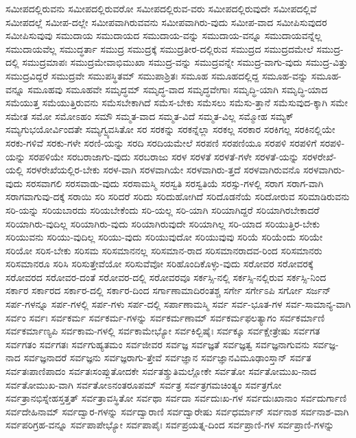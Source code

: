 {ಸಮೀಪದಲ್ಲಿರುವನು
ಸಮೀಪದಲ್ಲಿರುವರೋ
ಸಮೀಪದಲ್ಲಿರುವ-ವರು
ಸಮೀಪದಲ್ಲಿರುವುದೇ
ಸಮೀಪದಲ್ಲಿವೆ
ಸಮೀಪದಲ್ಲೆ
ಸಮೀಪ-ದಲ್ಲೇ
ಸಮೀಪವಾಗಿರುವವನು
ಸಮೀಪವಾಗಿರು-ವುದು
ಸಮೀಪ-ವಾದ
ಸಮೀಪಿಸುವುದರ
ಸಮೀಪಿಸುವುವು
ಸಮುದಾಯ
ಸಮುದಾಯದ
ಸಮುದಾಯ-ವನ್ನು
ಸಮುದಾಯ-ವನ್ನೂ
ಸಮುದಾಯವನ್ನೆಲ್ಲ
ಸಮುದಾಯವೆಲ್ಲ
ಸಮುದ್ಧರ್ತಾ
ಸಮುದ್ರ
ಸಮುದ್ರಕ್ಕೆ
ಸಮುದ್ರತೀರ-ದಲ್ಲಿರುವ
ಸಮುದ್ರದ
ಸಮುದ್ರದಮೇಲೆ
ಸಮುದ್ರ-ದಲ್ಲಿ
ಸಮುದ್ರಮಾಪಃ
ಸಮುದ್ರಮೇವಾಭಿಮುಖಾ
ಸಮುದ್ರ-ವನ್ನು
ಸಮುದ್ರವನ್ನೇ
ಸಮುದ್ರ-ವಾಗು-ವುದು
ಸಮುದ್ರ-ವಿತ್ತು
ಸಮುದ್ರವಿದ್ದರೆ
ಸಮುದ್ರವೇ
ಸಮುಪಸ್ಥಿತಮ್
ಸಮುಪಾಶ್ರಿತಃ
ಸಮೂಹ
ಸಮೂಹದಲ್ಲಿದ್ದ
ಸಮೂಹ-ವನ್ನು
ಸಮೂಹ-ವನ್ನೂ
ಸಮೂಹವು
ಸಮೂಹವೇ
ಸಮೃದ್ಧಮ್
ಸಮೃದ್ಧ-ವಾದ
ಸಮೃದ್ಧವೇಗಾಃ
ಸಮೃದ್ಧಿ-ಯಾಗಿ
ಸಮೃದ್ಧಿ-ಯಾದ
ಸಮೆಯುತ್ತ
ಸಮೆಯುತ್ತಿರುವನು
ಸಮೆಸಬೇಕಾಗಿದೆ
ಸಮೆಸ-ಬೇಕು
ಸಮೆಸಲು
ಸಮೆಸು-ತ್ತಾನೆ
ಸಮೆಸುವುದ-ಕ್ಕಾಗಿ
ಸಮೇ
ಸಮೇತ
ಸಮೋ
ಸಮೋಽಹಂ
ಸಮೌ
ಸಮ್ಮತ-ವಾದ
ಸಮ್ಮತ-ವಿದೆ
ಸಮ್ಮತ-ವಿಲ್ಲ
ಸಮ್ಮೋಹ
ಸಮ್ಯಕ್
ಸಮ್ಯಗುಭಯೋರ್ವಿಂದತೇ
ಸಮ್ಯಗ್ವ್ಯವಸಿತೋ
ಸರ
ಸರಕನ್ನು
ಸರಕನ್ನೆಲ್ಲಾ
ಸರಕಲ್ಲ
ಸರಕಾರ
ಸರಕಿಗಲ್ಲ
ಸರಕಿನಲ್ಲಿಯೇ
ಸರಕು-ಗಳಿವೆ
ಸರಕು-ಗಳೇ
ಸರಣಿ-ಯನ್ನು
ಸರದಿ
ಸರದಿಯಮೇಲೆ
ಸರಪಣಿ
ಸರಪಣಿಯೂ
ಸರಪಳಿ
ಸರಪಳಿಗೆ
ಸರಪಳಿ-ಯನ್ನು
ಸರಪಳಿಯೇ
ಸರಬರಾಜಾಗು-ವುದು
ಸರಬರಾಜು
ಸರಳ
ಸರಳತೆ
ಸರಳತೆ-ಗಳೇ
ಸರಳತೆ-ಯನ್ನು
ಸರಳರೇಖೆ-ಯಲ್ಲಿ
ಸರಳರೇಖೆಯಲ್ಲಿರ-ಬೇಕು
ಸರಳ-ವಾಗಿ
ಸರಳವಾಗಿಯೇ
ಸರಳವಾಗಿರು-ತ್ತದೆ
ಸರಳವಾಗಿರುವನೊ
ಸರಳವಾಗಿರು-ವುದು
ಸರಸವಾಗಲಿ
ಸರಸವಾಡು-ವುದು
ಸರಸಾಮಸ್ಮಿ
ಸರಸ್ವತಿ
ಸರಸ್ವತಿಯೆ
ಸರಸ್ಸು-ಗಳಲ್ಲಿ
ಸರಾಗ
ಸರಾಗ-ವಾಗಿ
ಸರಾಗವಾಗುವು-ದಕ್ಕೆ
ಸರಾಯಿ
ಸರಿ
ಸರಿದರೆ
ಸರಿದು
ಸರಿದುಹೋಗಿದೆ
ಸರಿದೊಡನೆಯೆ
ಸರಿದೋರುವ
ಸರಿಮಾಡಿರುವನು
ಸರಿ-ಯನ್ನು
ಸರಿಯಬಾರದು
ಸರಿಯಬೇಕೆಂದು
ಸರಿ-ಯಲ್ಲ
ಸರಿ-ಯಾಗಿ
ಸರಿಯಾಗಿದ್ದರೆ
ಸರಿಯಾಗಿರಬೇಕಾದರೆ
ಸರಿಯಾಗಿರು-ವುದಿಲ್ಲ
ಸರಿಯಾಗಿರು-ವುದು
ಸರಿಯಾಗಿರುವುದೇ
ಸರಿಯಾಗಿಲ್ಲ
ಸರಿ-ಯಾದ
ಸರಿಯುತ್ತಿರ-ಬೇಕು
ಸರಿಯುವನು
ಸರಿಯು-ವುದಿಲ್ಲ
ಸರಿಯು-ವುದು
ಸರಿಯುವುದೋ
ಸರಿಯುವುವು
ಸರಿಯೆ
ಸರಿಯೆಂದು
ಸರಿಯೇ
ಸರಿಯೋ
ಸರಿಸ-ಬೇಕು
ಸರಿಸಮ
ಸರಿಸಮಾನನಲ್ಲ
ಸರಿಸಮಾನ-ರಾದ
ಸರಿಸಮಾನರಾದವ-ರಿಂದ
ಸರಿಸಮಾನರು
ಸರಿಸಮಾನರೂ
ಸರಿಸಿ
ಸರಿಸುತ್ತೇವೆಯೋ
ಸರಿಸುವೆವೋ
ಸರಿಹೊಂದಿಕೊಳ್ಳು-ವುದು
ಸರೋವರ
ಸರೋವರಕ್ಕೆ
ಸರೋವರದ
ಸರೋವರ-ದಂತೆ
ಸರೋವರ-ದಲ್ಲಿ
ಸರೋವರವೂ
ಸರ್ಕಸ್ಸಿ-ನಲ್ಲಿ
ಸರ್ಕಸ್ಸಿ-ನಲ್ಲಿರುವ
ಸರ್ಕಸ್ಸಿ-ನಿಂದ
ಸರ್ಕಾರ
ಸರ್ಕಾರದ
ಸರ್ಕಾರ-ದಲ್ಲಿ
ಸರ್ಕಾರ-ದಿಂದ
ಸರ್ಗಾಣಾಮಾದಿರಂತಶ್ಚ
ಸರ್ಗೇ
ಸರ್ಗೇಽಪಿ
ಸರ್ಗೋ
ಸರ್ಜನ್
ಸರ್ಪ-ಗಳನ್ನೂ
ಸರ್ಪ-ಗಳಲ್ಲಿ
ಸರ್ಪ-ಗಳು
ಸರ್ಪ-ದಲ್ಲಿ
ಸರ್ಪಾಣಾಮಸ್ಮಿ
ಸರ್ವ
ಸರ್ವ-ಭೂತ-ಗಳ
ಸರ್ವ-ಸಾಮಾನ್ಯ-ವಾಗಿ
ಸರ್ವಂ
ಸರ್ವಃ
ಸರ್ವಕರ್ಮ
ಸರ್ವಕರ್ಮ-ಗಳನ್ನು
ಸರ್ವಕರ್ಮಣಾಮ್
ಸರ್ವಕರ್ಮಫಲತ್ಯಾಗಂ
ಸರ್ವಕರ್ಮಾಣಿ
ಸರ್ವಕರ್ಮಾಣ್ಯಪಿ
ಸರ್ವಕಾಮ-ಗಳಲ್ಲಿ
ಸರ್ವಕಾಮೇಭ್ಯೋ
ಸರ್ವಕಿಲ್ಬಿಷೈಃ
ಸರ್ವಕ್ಕೂ
ಸರ್ವಕ್ಷೇತ್ರೇಷು
ಸರ್ವಗತ
ಸರ್ವಗತಂ
ಸರ್ವಗತಃ
ಸರ್ವಗುಹ್ಯತಮಂ
ಸರ್ವಜೀವರ
ಸರ್ವಜ್ಞ
ಸರ್ವಜ್ಞತೆ
ಸರ್ವಜ್ಞತ್ವ
ಸರ್ವಜ್ಞನಾಗುವನು
ಸರ್ವಜ್ಞ-ನಾದ
ಸರ್ವಜ್ಞನಾದರೆ
ಸರ್ವಜ್ಞನು
ಸರ್ವಜ್ಞರಾಗು-ತ್ತೇವೆ
ಸರ್ವಜ್ಞಾನ
ಸರ್ವಜ್ಞಾನವಿಮೂಢಾಂಸ್ತಾನ್
ಸರ್ವತ
ಸರ್ವತಃಪಾಣಿಪಾದಂ
ಸರ್ವತಃಸಂಪ್ಲುತೋದಕೇ
ಸರ್ವತಶ್ಶ್ರುತಿಮಲ್ಲೋಕೇ
ಸರ್ವತೋ
ಸರ್ವತೋಮುಖ-ನಾದ
ಸರ್ವತೋಮುಖ-ವಾಗಿ
ಸರ್ವತೋಽನಂತರೂಪಮ್
ಸರ್ವತ್ರ
ಸರ್ವತ್ರಗಮಚಿಂತ್ಯಂ
ಸರ್ವತ್ರಗೋ
ಸರ್ವತ್ರಾನಭಿಸ್ನೇಹಸ್ತತ್ತತ್
ಸರ್ವತ್ರಾವಸ್ಥಿತೋ
ಸರ್ವಥಾ
ಸರ್ವದಾ
ಸರ್ವದುಃಖ-ಗಳ
ಸರ್ವದುಃಖಾನಾಂ
ಸರ್ವದುರ್ಗಾಣಿ
ಸರ್ವದೇಹಿನಾಮ್
ಸರ್ವದ್ವಾರ-ಗಳನ್ನು
ಸರ್ವದ್ವಾರಾಣಿ
ಸರ್ವದ್ವಾರೇಷು
ಸರ್ವಧರ್ಮಾನ್
ಸರ್ವನಾಶ
ಸರ್ವನಾಶ-ವಾಗಿ
ಸರ್ವಪರಿಗ್ರಹ-ವನ್ನೂ
ಸರ್ವಪಾಪೇಭ್ಯೋ
ಸರ್ವಪಾಪೈಃ
ಸರ್ವಪ್ರಯತ್ನ-ದಿಂದ
ಸರ್ವಪ್ರಾಣಿ-ಗಳ
ಸರ್ವಪ್ರಾಣಿ-ಗಳನ್ನು
}
